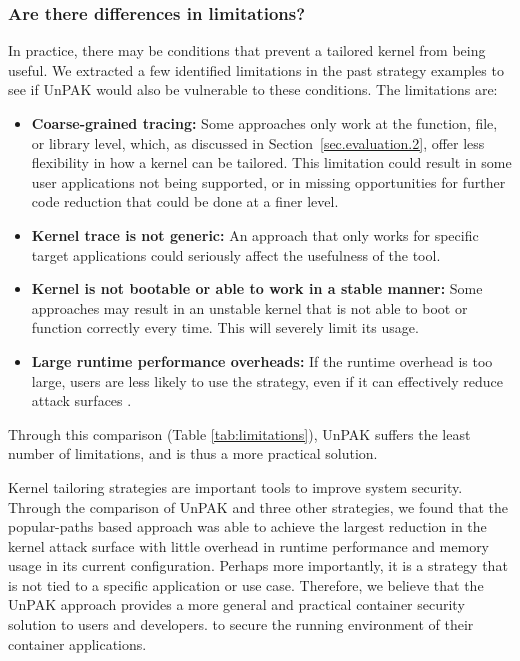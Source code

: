 \subsubsection{Are there differences in limitations?}
\label{sec.evaluation.5.3}
In practice, there may be conditions that prevent a tailored kernel from being useful. 
We extracted a few identified limitations in the past strategy examples to see if UnPAK would also be vulnerable to these conditions.  
The limitations are: 
\begin{itemize}
	\item \textbf{Coarse-grained tracing:} Some approaches only work at the function, file, or library level, which, as discussed in Section~{\ref{sec.evaluation.2}}, offer less flexibility in how a kernel can be tailored. This limitation could result in some user applications not being supported, or in missing opportunities for further code reduction that could be done at a finer level. 
	\item \textbf{Kernel trace is not generic:} An approach that only works for specific target applications could seriously affect the usefulness of the tool. 
	\item \textbf{Kernel is not bootable or able to work in a stable manner:} Some approaches may result in an unstable kernel that is not able to boot or function correctly every time. This will severely limit its usage. 
	\item \textbf{Large runtime performance overheads:} If the runtime overhead is too large, users are less likely to use the strategy, even if it can effectively reduce attack surfaces .   
\end{itemize}

Through this comparison (Table \ref{tab:limitations}), UnPAK suffers the least number of limitations, and is thus a more practical solution. 

Kernel tailoring strategies are important tools to improve system security. Through the comparison of UnPAK and three other strategies, 
we found that the popular-paths based approach was able to achieve the largest reduction in the kernel attack surface with little overhead in runtime performance 
and memory usage in its current configuration. Perhaps more importantly, it is a strategy that is not tied to a specific application or use case. 
Therefore, we believe that the UnPAK approach provides a more general and practical container security solution to users and developers. 
to secure the running environment of their container applications. 